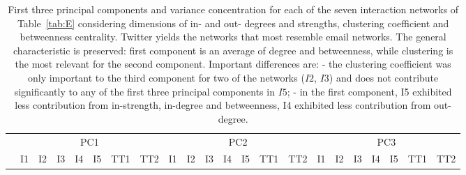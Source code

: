 \documentclass[%
	aip,
	jmp,%
	amsmath,amssymb,
	reprint,%
	floatfix,
]{revtex4-1}
\begin{document}
								\begin{table}[!h]
									\caption{First three principal components and variance concentration for each of the seven interaction networks of Table~\ref{tab:E} considering dimensions of in- and out- degrees and strengths, clustering coefficient and betweenness centrality. Twitter yields the networks that most resemble email networks. The general characteristic is preserved: first component is an average of degree and betweenness, while clustering is the most relevant for the second component. Important differences are: - the clustering coefficient was only important to the third component for two of the networks ($I2$, $I3$) and does not contribute significantly to any of the first three principal components in $I5$; - in the first component, I5 exhibited less contribution from in-strength, in-degree and betweenness, I4 exhibited less contribution from out-degree.}
									\footnotesize
									\begin{center}
										\begin{tabular}{| l ||  c |c |c |c |c | c | c || c | c | c | c | c | c | c || c |c |c |c |c | c | c |	}\cline{2-22}
											\multicolumn{1}{c|}{} & \multicolumn{7}{c||}{PC1}          & \multicolumn{7}{c||}{PC2} & \multicolumn{7}{c|}{PC3}  \\\cline{2-22}
											\multicolumn{1}{c|}{} & 
											I1 & I2 & I3 & I4 & I5 & TT1 & TT2 &
											I1 & I2 & I3 & I4 & I5 & TT1 & TT2 &
											I1 & I2 & I3 & I4 & I5 & TT1 & TT2 \\\hline
											
											\hline
										\end{tabular}
									\end{center}
									\label{tab:pcaE2}
								\end{table}
\end{document}
